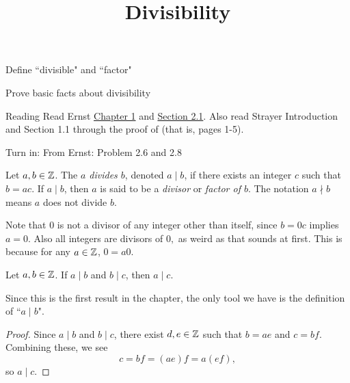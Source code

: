 \documentclass{ximera}
\title{Divisibility}
\begin{document}
\begin{abstract}
\end{abstract}
\maketitle


\begin{obj}
  \item Define ``divisible" and ``factor"
  \item Prove basic facts about divisibility
\end{obj}
 

\begin{instructorNotes}
  \begin{pre}
    \item[Reading]  Read Ernst  \href{https://danaernst.com/IBL-IntroToProof/pretext/chap_intro.html}{Chapter 1} and \href{https://danaernst.com/IBL-IntroToProof/pretext/sec_baby_number_theory.html}{Section 2.1}. Also read Strayer Introduction and Section 1.1 through the proof of  (that is, pages 1-5).
  
    \item[Turn in:] From Ernst: Problem 2.6 and 2.8
  \end{pre}
\end{instructorNotes}


\begin{defn}[$a$ divides $b$]\label{defn:divides}
  Let $a,b\in \mathbb Z$. The \emph{$a$ divides $b$}, denoted $a\mid b$,  if there exists an integer $c$ such that $b=ac$. 
  If $a\mid b$, then $a$ is said to be a \emph{divisor} or \emph{factor of $b$}. The notation $a\nmid b$ means $a$ does not divide $b$.
\end{defn}

Note that $0$ is not a divisor of any integer other than itself, since $b=0c$ implies $a=0$. Also all integers are divisors of $0,$ as weird as that sounds at first. This is because for any $a\in\mathbb Z$, $0=a0$.

\begin{proposition}\label{prop:div-trans}
Let $a,b\in\mathbb Z$. If $a\mid b$ and $b \mid c$, then $a\mid c$.
\end{proposition}

Since this is the first result in the chapter, the only tool we have is the definition of ``$a\mid b$". 

\begin{proof}
  Since $a\mid b$ and $b \mid c$, there exist $d,e\in\mathbb Z$ such that $b=ae$ and $c=bf$. Combining these, we see \[c=bf=(ae)f=a(ef),\] so $a\mid c$.
\end{proof}
\end{document}
